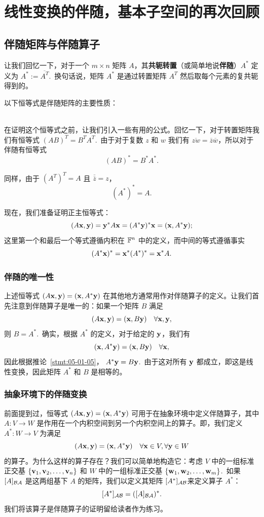 \section{线性变换的伴随，基本子空间的再次回顾}\label{sec:05-05}

\subsection{伴随矩阵与伴随算子}\label{sec:05-05-01}

让我们回忆一下，对于一个 $m \times n$ 矩阵 $A$，其\textbf{共轭转置}（或简单地说\textbf{伴随}）$A^*$ 定义为 $A^* := \overline{A^T}$.~换句话说，矩阵 $A^*$ 是通过转置矩阵 $A^T$ 然后取每个元素的复共轭得到的。

以下恒等式是伴随矩阵的主要性质：

\\
在证明这个恒等式之前，让我们引入一些有用的公式。回忆一下，对于转置矩阵我们有恒等式 $(AB)^T = B^T A^T$.~由于对于复数 $z$ 和 $w$ 我们有 $\overline{zw} = \overline{z}\overline{w}$，所以对于伴随有恒等式 $$(AB)^* = B^*A^*.$$

同样，由于 $(A^T)^T = A$ 且 $\overline{\overline{z}} = z$，
$$(A^*)^* = A.$$

现在，我们准备证明正主恒等式：$$(A\mathbf{x}, \mathbf{y}) = \mathbf{y}^*A\mathbf{x} = (A^*\mathbf{y})^*\mathbf{x} = (\mathbf{x}, A^*\mathbf{y});$$
这里第一个和最后一个等式遵循内积在 $\mathbb{F}^n$ 中的定义，而中间的等式遵循事实 $$(A^*\mathbf{x})^* = \mathbf{x}^*(A^*)^* = \mathbf{x}^*A.$$


\subsubsection{伴随的唯一性}\label{sec:05-05-01-01}

上述恒等式 $(A\mathbf{x}, \mathbf{y}) = (\mathbf{x}, A^*\mathbf{y})$ 在其他地方通常用作对伴随算子的定义。让我们首先注意到伴随算子是唯一的：如果一个矩阵 $B$ 满足
$$(A\mathbf{x}, \mathbf{y}) = (\mathbf{x}, B\mathbf{y}) \quad \forall \mathbf{x}, \mathbf{y},$$
则 $B = A^*$.~确实，根据 $A^*$ 的定义，对于给定的 $\mathbf{y}$，我们有
$$(\mathbf{x}, A^*\mathbf{y}) = (\mathbf{x}, B\mathbf{y}) \quad \forall \mathbf{x},$$
因此根据推论~\ref{stmt:05-01-05}， $A^*\mathbf{y} = B\mathbf{y}$.~由于这对所有 $\mathbf{y}$ 都成立，即这是线性变换，因此矩阵 $A^*$ 和 $B$ 是相等的。


\subsubsection{抽象环境下的伴随变换}\label{sec:05-05-01-02}

前面提到过，恒等式 $(A\mathbf{x}, \mathbf{y}) = (\mathbf{x}, A^*\mathbf{y})$ 可用于在抽象环境中定义伴随算子，其中 $A: V \to W$ 是作用在一个内积空间到另一个内积空间上的算子。即，我们定义 $A^*: W \to V$ 为满足 $$(A\mathbf{x}, \mathbf{y}) = (\mathbf{x}, A^*\mathbf{y}) \quad \forall \mathbf{x} \in V, \forall \mathbf{y} \in W$$
的算子。为什么这样的算子存在？我们可以简单地构造它：考虑 $V$ 中的一组标准正交基 $\{\mathbf{v}_1, \mathbf{v}_2, \dots, \mathbf{v}_n\}$ 和 $W$ 中的一组标准正交基 $\{\mathbf{w}_1, \mathbf{w}_2, \dots, \mathbf{w}_m\}$.~如果 $[A]_{\mathcal{B}\mathcal{A}}$ 是这两组基下 $A$ 的矩阵，我们以定义其矩阵 $[A^*]_{\mathcal{A}\mathcal{B}}$来定义算子 $A^*$：
$$[A^*]_{\mathcal{A}\mathcal{B}} = ([A]_{\mathcal{B}\mathcal{A}})^*.$$
我们将该算子是伴随算子的证明留给读者作为练习。

